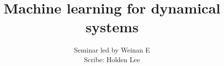 \def\filepath{templates}








\def\name{Machine learning for dynamical systems}


\pagestyle{fancy}
\chead{} 
\lfoot{} 
\cfoot{\thepage} 
\rfoot{} %
\renewcommand{\headrulewidth}{.3pt} 
\setlength\voffset{0in}


%
\title{Machine learning for dynamical systems}
\author{Seminar led by Weinan E\\ Scribe: Holden Lee}
\maketitle


\tableofcontents














%

%
%

\printnomenclature
\printindex
